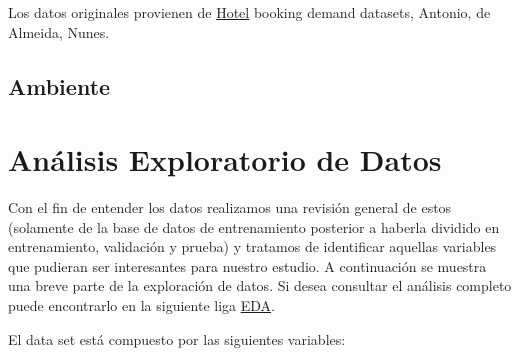 \documentclass[
]{article}
\begin{document}
Los datos originales provienen de
\href{https://www.sciencedirect.com/science/article/pii/S2352340918315191}{Hotel}
booking demand datasets, Antonio, de Almeida, Nunes.

\hypertarget{ambiente}{%
\subsection{Ambiente}\label{ambiente}}

\hypertarget{anuxe1lisis-exploratorio-de-datos}{%
\section{Análisis Exploratorio de
Datos}\label{anuxe1lisis-exploratorio-de-datos}}

Con el fin de entender los datos realizamos una revisión general de
estos (solamente de la base de datos de entrenamiento posterior a
haberla dividido en entrenamiento, validación y prueba) y tratamos de
identificar aquellas variables que pudieran ser interesantes para
nuestro estudio. A continuación se muestra una breve parte de la
exploración de datos. Si desea consultar el análisis completo puede
encontrarlo en la siguiente liga
\href{https://github.com/marcoyel21/hotel_cancelation_ML21/blob/main/final/EDA_Cancelaciones.Rmd}{EDA}.

El data set está compuesto por las siguientes variables:
\end{document}
